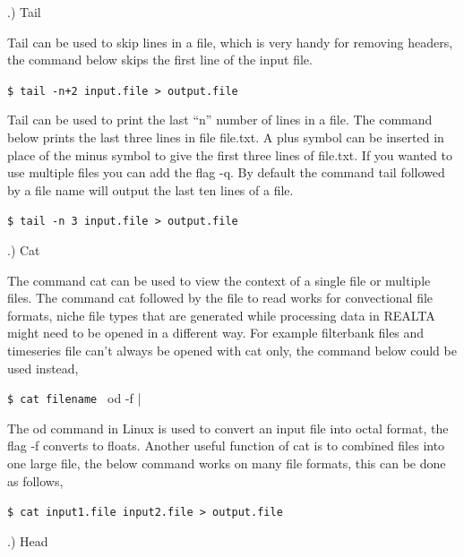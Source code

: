\documentclass[11pt,fleqn]{book} %
\begin{document}
.) Tail
\vspace{3mm}

\noindent Tail can be used to skip lines in a file, which is very handy for removing headers, the command below skips the first line of the input file. 

\vspace{3mm}

\verb|$ tail -n+2 input.file > output.file|

\vspace{3mm}
\noindent Tail can be used to print the last “n” number of lines in a file. The command below prints the last three lines in file file.txt. A plus symbol can be inserted in place of the minus symbol to give the first three lines of file.txt. If you wanted to use multiple files you can add the flag -q. By default the command tail followed by a file name will output the last ten lines of a file. 
\vspace{3mm}

\verb|$ tail -n 3 input.file > output.file|

\vspace{3mm}
\vspace{3mm}
.) Cat
\vspace{3mm}

\noindent The command cat can be used to view the context of a single file or multiple files. The command cat followed by the file to read works for convectional file formats, niche file types that are generated while processing data in REALTA might need to be opened in a different way. For example filterbank files and timeseries file can't always be opened with cat only, the command below could be used instead,  
\vspace{3mm}
%

\verb|$ cat filename | od -f |

\vspace{3mm}
\noindent The od command in Linux is used to convert an input file into octal format, the flag -f converts to floats. Another useful function of cat is to combined files into one large file, the below command works on many file formats, this can be done as follows,
\vspace{3mm}

\verb|$ cat input1.file input2.file > output.file|

\vspace{3mm}
.) Head
\vspace{3mm}
\end{document}
